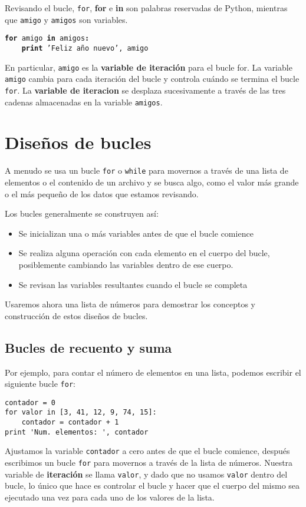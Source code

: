 Revisando el bucle, {\tt for}, {\bf for} e {\bf in} son palabras
reservadas de Python, mientras que {\tt amigo} y {\tt amigos} son variables.

{\tt {\bf for} amigo {\bf in} amigos{\bf :}\\
\verb"    "{\bf print} 'Feliz año nuevo', amigo }

En particular, {\tt amigo} es la {\bf variable de iteración} para
el bucle for. La variable {\tt amigo} cambia para cada iteración del
bucle y controla cuándo se termina el bucle {\tt for}. La
{\bf variable de iteracion} se desplaza sucesivamente a través de
las tres cadenas almacenadas en la variable {\tt amigos}.


\section{Diseños de bucles}

A menudo se usa un bucle {\tt for} o {\tt while} para movernos a través de una lista de elementos
o el contenido de un archivo y se busca algo, como el valor
más grande o el más pequeño de los datos que estamos revisando.

Los bucles generalmente se construyen así:

\begin{itemize}

\item Se inicializan una o más variables antes de que el bucle comience

\item Se realiza alguna operación con cada elemento en el cuerpo del bucle,
posiblemente cambiando las variables dentro de ese cuerpo.

\item Se revisan las variables resultantes cuando el bucle se completa

\end{itemize}

Usaremos ahora una lista de números para demostrar los conceptos y construcción
de estos diseños de bucles.

\subsection{Bucles de recuento y suma}

Por ejemplo, para contar el número de elementos
en una lista, podemos escribir el siguiente bucle {\tt for}:

\beforeverb
\begin{verbatim}
contador = 0
for valor in [3, 41, 12, 9, 74, 15]:
    contador = contador + 1
print 'Num. elementos: ', contador
\end{verbatim}
\afterverb
%
Ajustamos la variable {\tt contador} a cero antes de que el bucle comience,
después escribimos un bucle {\tt for} para movernos a través de la lista de números.
Nuestra variable de {\bf iteración} se llama {\tt valor}, y dado que no
usamos {\tt valor} dentro del bucle, lo único que hace es controlar el bucle
y hacer que el cuerpo del mismo sea ejecutado una vez para cada uno de los
valores de la lista.

